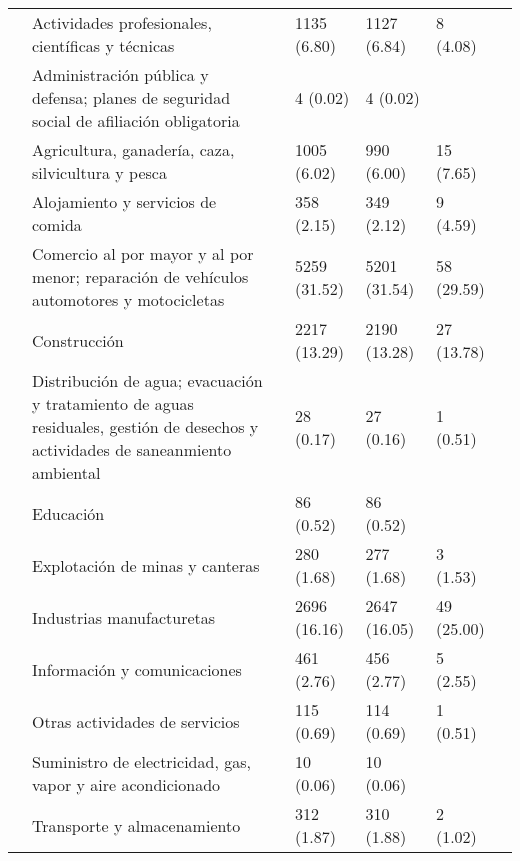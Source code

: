 \begin{tabular}{lllllll}
{{ & Actividades profesionales,  científicas y técnicas &  & 1135 (6.80) & 1127 (6.84) & 8 (4.08) &  \\
 & Administración pública y defensa; planes de seguridad social de afiliación obligatoria &  & 4 (0.02) & 4 (0.02) &  &  \\
 & Agricultura, ganadería, caza, silvicultura y pesca &  & 1005 (6.02) & 990 (6.00) & 15 (7.65) &  \\
 & Alojamiento y servicios de comida &  & 358 (2.15) & 349 (2.12) & 9 (4.59) &  \\
 & Comercio al por mayor y al por menor; reparación de vehículos automotores y motocicletas &  & 5259 (31.52) & 5201 (31.54) & 58 (29.59) &  \\
 & Construcción &  & 2217 (13.29) & 2190 (13.28) & 27 (13.78) &  \\
 & Distribución de agua; evacuación y tratamiento de aguas residuales, gestión de desechos y actividades de saneanmiento ambiental &  & 28 (0.17) & 27 (0.16) & 1 (0.51) &  \\
 & Educación &  & 86 (0.52) & 86 (0.52) &  &  \\
 & Explotación de minas y canteras &  & 280 (1.68) & 277 (1.68) & 3 (1.53) &  \\
 & Industrias manufacturetas &  & 2696 (16.16) & 2647 (16.05) & 49 (25.00) &  \\
 & Información y comunicaciones &  & 461 (2.76) & 456 (2.77) & 5 (2.55) &  \\
 & Otras actividades de servicios &  & 115 (0.69) & 114 (0.69) & 1 (0.51) &  \\
 & Suministro de electricidad, gas, vapor y aire acondicionado &  & 10 (0.06) & 10 (0.06) &  &  \\
 & Transporte y almacenamiento &  & 312 (1.87) & 310 (1.88) & 2 (1.02) &  \\
\cline{1-7}
\bottomrule
\end{tabular}
